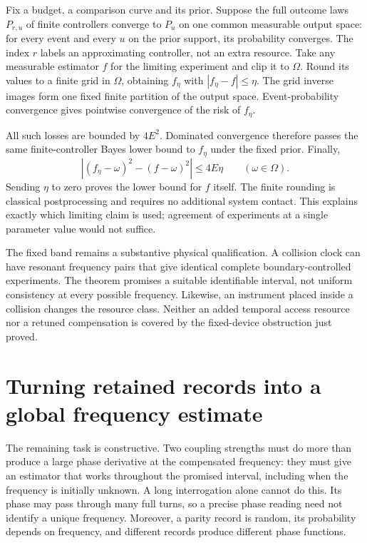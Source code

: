\documentclass[11pt,a4paper]{article}
\numberwithin{equation}{section}
\theoremstyle{remark}
\begin{document}
Fix a budget, a comparison curve and its prior. Suppose the full outcome
laws $P_{r,u}$ of finite controllers converge to $P_u$ on one common
measurable output space: for every event and every $u$ on the prior
support, its probability converges. The index $r$ labels an approximating
controller, not an extra resource. Take any measurable estimator $f$ for
the limiting experiment and clip it to $\Omega$. Round its values to a
finite grid in $\Omega$, obtaining $f_\eta$ with
$|f_\eta-f|\le\eta$. The grid inverse images form one fixed finite
partition of the output space. Event-probability convergence gives
pointwise convergence of the risk of $f_\eta$.

All such losses are bounded by $4E^2$. Dominated convergence therefore
passes the same finite-controller Bayes lower bound to $f_\eta$ under
the fixed prior. Finally,
\begin{equation}
 |(f_\eta-\omega)^2-(f-\omega)^2|\le4E\eta
 \qquad (\omega\in\Omega).
\end{equation}
Sending $\eta$ to zero proves the lower bound for $f$ itself. The finite
rounding is classical postprocessing and requires no additional system
contact. This explains exactly which limiting claim is used; agreement
of experiments at a single parameter value would not suffice.

The fixed band remains a substantive physical qualification. A collision
clock can have resonant frequency pairs that give identical complete
boundary-controlled experiments. The theorem promises a suitable
identifiable interval, not uniform consistency at every possible
frequency. Likewise, an instrument placed inside a collision changes the
resource class. Neither an added temporal access resource nor a retuned
compensation is covered by the fixed-device obstruction just proved.


\section{Turning retained records into a global frequency estimate}
\label{phase:section}

The remaining task is constructive.  Two coupling strengths must do more than
produce a large phase derivative at the compensated frequency: they must give
an estimator that works throughout the promised interval, including when the
frequency is initially unknown.  A long interrogation alone cannot do this.
Its phase may pass through many full turns, so a precise phase reading need not
identify a unique frequency.  Moreover, a parity record is random, its
probability depends on frequency, and different records produce different
phase functions.
\end{document}
